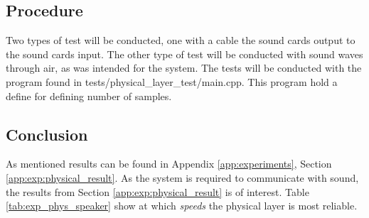 	\subsection{Procedure}
	Two types of test will be conducted, one with a cable the sound cards output to the sound cards input. The other type of test will be conducted with sound waves through air, as was intended for the system.
	The tests will be conducted with the program found in tests/physical\_layer\_test/main.cpp. This program hold a define for defining number of samples.
	
	\subsection{Conclusion}
	As mentioned results can be found in Appendix \ref{app:experiments}, Section \ref{app:exp:physical_result}. As the system is required to communicate with sound, the results from Section \ref{app:exp:physical_result} is of interest. Table \ref{tab:exp_phys_speaker} show at which \textit{speeds} the physical layer is most reliable.